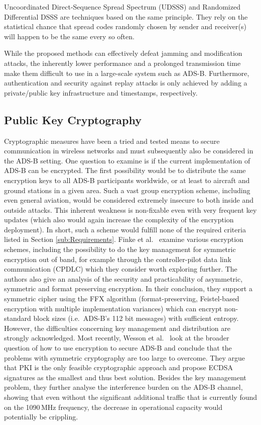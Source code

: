 \documentclass[english]{IEEEtran}
\begin{document}
Uncoordinated Direct-Sequence Spread Spectrum (UDSSS) \cite{Christina2009}
and Randomized Differential DSSS \cite{Liu2010} are techniques based
on the same principle. They rely on the statistical chance that spread
codes randomly chosen by sender and receiver(s) will happen to be
the same every so often. 

While the proposed methods can effectively defeat jamming and modification
attacks, the inherently lower performance and a prolonged transmission
time make them difficult to use in a large-scale system such as ADS-B.
Furthermore, authentication and security against replay attacks is
only achieved by adding a private/public key infrastructure and timestamps,
respectively.\\



\subsection{Public Key Cryptography}

Cryptographic measures have been a tried and tested means to secure
communication in wireless networks and must subsequently also be considered
in the ADS-B setting. One question to examine is if the current implementation
of ADS-B can be encrypted. The first possibility would be to distribute
the same encryption keys to all ADS-B participants worldwide, or at
least to aircraft and ground stations in a given area. Such a vast
group encryption scheme, including even general aviation, would be
considered extremely insecure to both inside and outside attacks.
This inherent weakness is non-fixable even with very frequent key
updates (which also would again increase the complexity of the encryption
deployment). In short, such a scheme would fulfill none of the required
criteria listed in Section \ref{sub:Requirements}. Finke et al.~\cite{Finke2013a}
examine various encryption schemes, including the possibility to do
the key management for symmetric encryption out of band, for example
through the controller-pilot data link communication (CPDLC) which
they consider worth exploring further. The authors also give an analysis
of the security and practicability of asymmetric, symmetric and format
preserving encryption. In their conclusion, they support a symmetric
cipher using the FFX algorithm (format-preserving, Feistel-based encryption
with multiple implementation variances) which can encrypt non-standard
block sizes (i.e.~ADS-B's 112 bit messages) with sufficient entropy.
However, the difficulties concerning key management and distribution
are strongly acknowledged. Most recently, Wesson et al.~\cite{wessoncan}
look at the broader question of how to use encryption to secure ADS-B
and conclude that the problems with symmetric cryptography are too
large to overcome. They argue that PKI is the only feasible cryptographic
approach and propose ECDSA signatures as the smallest and thus best
solution. Besides the key management problem, they further analyse
the interference burden on the ADS-B channel, showing that even without
the significant additional traffic that is currently found on the
1090\,MHz frequency, the decrease in operational capacity would potentially
be crippling.
\end{document}
